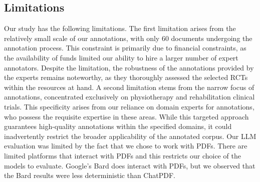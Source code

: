 \documentclass[sn-mathphys,Numbered]{sn-jnl}%
\theoremstyle{thmstyleone}%
\theoremstyle{thmstyletwo}%
\theoremstyle{thmstylethree}%
\begin{document}

%
%
%
\subsection{Limitations}
\label{subsec:limits}
%
Our study has the following limitations.
The first limitation arises from the relatively small scale of our annotations, with only 60 documents undergoing the annotation process.
This constraint is primarily due to financial constraints, as the availability of funds limited our ability to hire a larger number of expert annotators.
Despite the limitation, the robustness of the annotations provided by the experts remains noteworthy, as they thoroughly assessed the selected RCTs within the resources at hand.
A second limitation stems from the narrow focus of annotations, concentrated exclusively on physiotherapy and rehabilitation clinical trials.
This specificity arises from our reliance on domain experts for annotations, who possess the requisite expertise in these areas.
While this targeted approach guarantees high-quality annotations within the specified domains, it could inadvertently restrict the broader applicability of the annotated corpus.
Our LLM evaluation was limited by the fact that we chose to work with PDFs. 
There are limited platforms that interact with PDFs and this restricts our choice of the models to evaluate.
Google's Bard does interact with PDFs, but we observed that the Bard results were less deterministic than ChatPDF.
%
%
%
\end{document}
